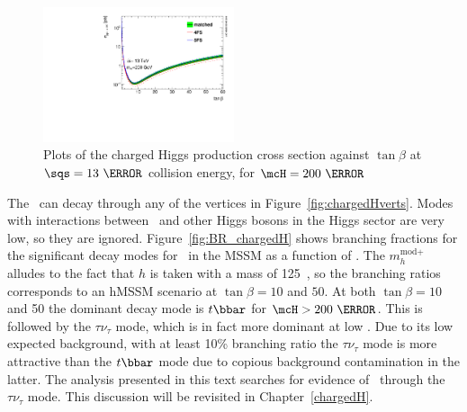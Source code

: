 \begin{figure}[h]
\centering
   \includegraphics[width=0.5\textwidth]{figures/xsec_mhp_200.pdf}
\caption{Plots of the charged Higgs production cross section against $\tan\beta$ at $\sqs=13~\TeV$ 
collision energy, for $\mcH=200~\GeV$}
\label{fig:chargedHxs}
\end{figure}

\par The \Hplus\ can decay through any of the vertices in Figure~\ref{fig:chargedHverts}. Modes 
with interactions between \Hplus\ and other Higgs bosons in the Higgs sector are very 
low, so they are ignored. Figure~\ref{fig:BR_chargedH} shows branching fractions for the significant 
decay modes for \Hplus\ in the MSSM as a function of \mcH. The $m_h^{\text{mod+}}$ alludes to the fact 
that $h$ is taken with a mass of 125~\GeV, so the branching ratios corresponds to an hMSSM scenario at 
$\tan\beta=10$ and $50$. At both $\tan\beta=10$ and 50 the dominant decay mode is $t\bbar$ for $\mcH>200~\GeV$. 
This is followed by the $\tau\nu_\tau$ mode, which is in fact more dominant at low \mcH. Due to its low 
expected background, with at least 10\% branching ratio the $\tau\nu_\tau$ mode is more attractive 
than the $t\bbar$ mode due to copious background contamination in the latter. The analysis presented 
in this text searches for evidence of \Hplus\ through the $\tau\nu_\tau$ mode. This discussion will 
be revisited in Chapter~\ref{chargedH}. 

